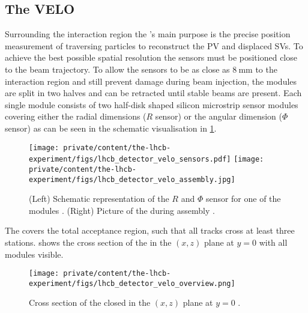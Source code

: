 \subsection{The \acl*{VELO}}
\label{sec:lhcb_experiment:tracking:velo}

Surrounding the \protonproton interaction region the \VELO's main purpose is the
precise position measurement of traversing particles to reconstruct the \ac{PV}
and displaced \acp{SV}. To achieve the best possible spatial resolution the
sensors must be positioned close to the beam trajectory. To allow the sensors to
be as close as $\SI{8}{\milli\metre}$ to the interaction region and still
prevent damage during beam injection, the \VELO modules are split in two halves
and can be retracted until stable beams are present. Each single module consists
of two half-disk shaped silicon microstrip sensor modules covering either the
radial dimensions ($R$ sensor) or the angular dimension ($\Phi$ sensor) as can
be seen in the schematic visualisation in
\cref{fig:lhcb_experiment:tracking:velo:sensor}.
%
\begin{figure}[t]
  \texttt{[image: private/content/the-lhcb-experiment/figs/lhcb\_detector\_velo\_sensors.pdf]}
  \texttt{[image: private/content/the-lhcb-experiment/figs/lhcb\_detector\_velo\_assembly.jpg]}
  \caption{(Left) Schematic representation of the $R$ and $\Phi$ sensor for one
  of the \VELO modules \cite{Alves:2008zz}. (Right) Picture of the \VELO during
  assembly \cite{Aaij:1707015}. }
  \label{fig:lhcb_experiment:tracking:velo:sensor}
\end{figure}
%
The \VELO covers the total \LHCb acceptance region, such that all tracks cross
at least three \VELO stations. 
shows the cross section of the \VELO in the $(x,z)$ plane at $y=0$ with all
modules visible.
%
\begin{figure}[t]
  \texttt{[image: private/content/the-lhcb-experiment/figs/lhcb\_detector\_velo\_overview.png]}
  \caption{
    Cross section of the closed \VELO in the $(x,z)$ plane at $y=0$ \cite{Alves:2008zz}.
  }
  \label{fig:lhcb_experiment:tracking:velo:overview}
\end{figure}

